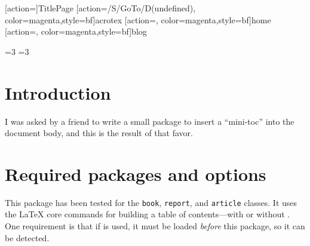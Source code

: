 \documentclass[10pt]{article}
\begin{document}
\maketitle

[action={}]{TitlePage}
[action={/S/GoTo/D(undefined)},%
  color=magenta,style={bf}]{acrotex}
[action={},%
  color=magenta,style={bf}]{home}
[action={},%
  color=magenta,style={bf}]{blog}


\bgroup
\value{secnumdepth}=3
\value{tocdepth}=3
\tableofcontents
\egroup
{}

\def\AcroT{Acro\!\TeX}\def\cAcroT{\textcolor{blue}{\AcroT}}
\def\AcroEB{\AcroT{} eDucation Bundle}\def\cAcroEB{\textcolor{blue}{\AcroEB}}
\def\AcroB{\AcroT{} Bundle}\def\cAcroB{\textcolor{blue}{\AcroB}}
\def\bUrl{http://www.math.uakron.edu/~dpstory}

\hypersetup{linktocpage}

\section{Introduction}

I was asked by a friend to write a small package to insert a ``mini-toc'' into
the document body, and this is the result of that favor.


\section{Required packages and options}

This package has been tested for the \texttt{book}, \texttt{report}, and \texttt{article} classes. It uses
the {\LaTeX} core commands for building a table of contents---with or without . One requirement
is that if  is used, it must be loaded \textit{before} this package, so it can be detected.
\end{document}
